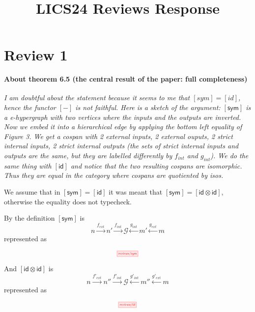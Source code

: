 \documentclass{article}
\newcommand\id{\textsf{id}}
\newcommand\sym{\textsf{sym}}
\begin{document}
\title{LICS24 Reviews Response}
\author{}

\maketitle

\section*{Review 1}
\paragraph{About theorem 6.5 (the central result of the paper: full completeness)}
\textit{I am doubtful about the statement because it seems to me that $[sym] = [id]$,
hence the functor $[-]$ is not faithful.
Here is a sketch of the argument: $[\sym]$ is a e-hypergraph with two vertices
where the inputs and the outputs are inverted. Now we embed it into a
hierarchical edge by applying the bottom left equality of Figure 3.
We get a cospan with 2 external inputs, 2 external ouputs, 2 strict internal
inputs, 2 strict internal outputs (the sets of strict internal inputs and
outputs are the same, but they are labelled differently by $f_{int}$ and $g_{int}$). We
do the same thing with $[\id]$ and notice that the two resulting cospans are
isomorphic. Thus they are equal in the category where cospans are quotiented by
isos.}

We assume that in $[\sym] = [\id]$ it was meant that $[\sym] = [\id \otimes \id]$, otherwise the equality does not typecheck.

By the definition $[\sym]$ is 
\[
    n \xrightarrow{f_{ext}} n' \xrightarrow{f_{int}} \mathcal{G} \xleftarrow{g_{int}} m' \xleftarrow{g_{ext}} m
\]
represented as
\begin{figure}[h!]
    \[
    \scalebox{0.5}{
        \tikzfig{reviews/sym}
    }
    \]
\end{figure}

And $[\id \otimes \id]$ is \[
    n \xrightarrow{f'_{ext}} n'' \xrightarrow{f'_{int}} \mathcal{G} \xleftarrow{g'_{int}} m'' \xleftarrow{g'_{ext}} m
\]
represented as 
\begin{figure}[h!]
    \[
    \scalebox{0.5}{
        \tikzfig{reviews/id}
    }
    \]
\end{figure}
\end{document}
